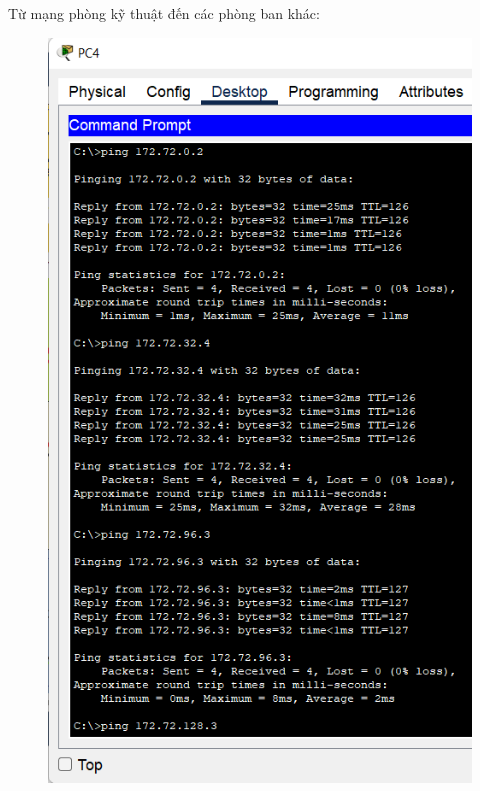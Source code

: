 \begin{enumerate}
\begin{enumerate}
Từ mạng phòng kỹ thuật đến các phòng ban khác:
\begin{figure}[H]
\begin{center}
\includegraphics[scale=.5]{../figures/p2/test-ping-5}

\end{center}
\end{figure}
\end{enumerate}
\end{enumerate}
